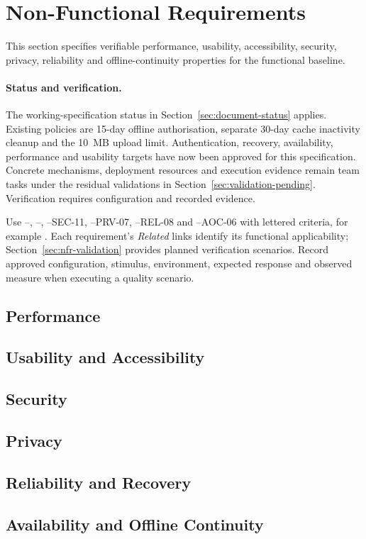 \section{Non-Functional Requirements}
\label{sec:non-functional-requirements}\label{sec:nfr-traceability}
This section specifies verifiable performance, usability, accessibility, security,
privacy, reliability and offline-continuity properties for the functional baseline.

\paragraph{Status and verification.}\label{sec:nfr-targets}
The working-specification status in Section~\ref{sec:document-status} applies.
Existing policies are 15-day offline authorisation, separate 30-day cache inactivity
cleanup and the 10~MB upload limit. Authentication, recovery, availability,
performance and usability targets have now been approved for this specification.
Concrete mechanisms, deployment resources and execution evidence remain team tasks under
the residual validations in Section~\ref{sec:validation-pending}. Verification requires configuration and
recorded evidence.

Use --, --,
--SEC-11, --PRV-07, --REL-08 and --AOC-06 with lettered
criteria, for example . Each requirement's \emph{Related}
links identify its functional applicability; Section~\ref{sec:nfr-validation}
provides planned verification scenarios. Record approved configuration, stimulus,
environment, expected response and observed measure when executing a quality
scenario.

\subsection{Performance}\label{sec:nfr-performance}


\subsection{Usability and Accessibility}\label{sec:nfr-usability}


\subsection{Security}

\subsection{Privacy}

\subsection{Reliability and Recovery}

\subsection{Availability and Offline Continuity}

